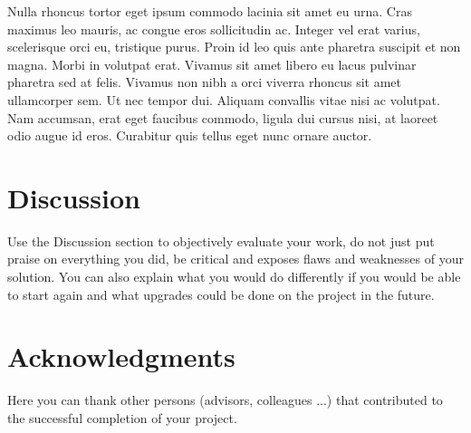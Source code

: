 \documentclass[fleqn,moreauthors,10pt]{ds_report}
\begin{document}
Nulla rhoncus tortor eget ipsum commodo lacinia sit amet eu urna. Cras maximus leo mauris, ac congue eros sollicitudin ac. Integer vel erat varius, scelerisque orci eu, tristique purus. Proin id leo quis ante pharetra suscipit et non magna. Morbi in volutpat erat. Vivamus sit amet libero eu lacus pulvinar pharetra sed at felis. Vivamus non nibh a orci viverra rhoncus sit amet ullamcorper sem. Ut nec tempor dui. Aliquam convallis vitae nisi ac volutpat. Nam accumsan, erat eget faucibus commodo, ligula dui cursus nisi, at laoreet odio augue id eros. Curabitur quis tellus eget nunc ornare auctor.



\section*{Discussion}

Use the Discussion section to objectively evaluate your work, do not just put praise on everything you did, be critical and exposes flaws and weaknesses of your solution. You can also explain what you would do differently if you would be able to start again and what upgrades could be done on the project in the future.



\section*{Acknowledgments}

Here you can thank other persons (advisors, colleagues ...) that contributed to the successful completion of your project.




\end{document}
